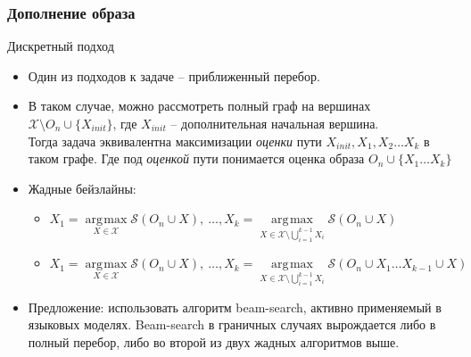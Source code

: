 \documentclass[10pt]{beamer}
\DeclareMathOperator*{\argmax}{\arg\!\max}
\begin{document}
\begin{frame}
	\frametitle{Дополнение образа}
	\begin{block}{Дискретный подход}
		\begin{itemize}
			\item Один из подходов к задаче -- приближенный перебор. 
			\item В таком случае, можно рассмотреть полный граф на вершинах $\mathcal{X}\setminus O_n \cup \{X_{init}\}$, где $X_{init}$ -- дополнительная начальная вершина. \\
			Тогда задача эквивалентна максимизации \textit{оценки} пути $X_{init}, X_1, X_2\dots X_k$ в таком графе. Где под \textit{оценкой} пути понимается оценка образа $O_n\cup\{X_1\dots X_k\}$
			\item Жадные бейзлайны:
			\begin{itemize}
				\item $X_1 = \argmax\limits_{X\in\mathcal{X}}{\mathcal{S}(O_n\cup X)},~\dots , X_k = \argmax\limits_{X\in\mathcal{X}\setminus \bigcup\limits_{i=1}^{k-1} X_i} \mathcal{S}(O_n\cup X)$
				\item $X_1 = \argmax\limits_{X\in\mathcal{X}}{\mathcal{S}(O_n\cup X)},~\dots , X_k = \argmax\limits_{X\in\mathcal{X}\setminus \bigcup\limits_{i=1}^{k-1} X_i} \mathcal{S}(O_n\cup X_1\dots X_{k-1}\cup X)$
			\end{itemize}
			\item Предложение: использовать алгоритм beam-search, активно применяемый в языковых моделях. Beam-search в граничных случаях вырождается либо в полный перебор, либо во второй из двух жадных алгоритмов выше.
		\end{itemize}
	\end{block}
\end{frame}
\end{document}
